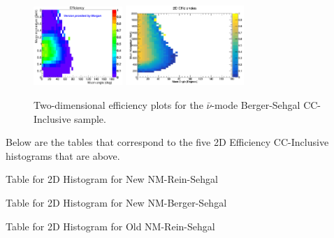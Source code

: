 \documentclass[11pt]{article}
\begin{document}
\begin{figure}[H]
\centering
\includegraphics[width=0.3\textwidth]{CCInclusivePlots/MorgansCCInclusiveSample.png}
\includegraphics[width=0.4\textwidth]{CCInclusivePlots/2DEffCompareANMBS.png}
\caption{Two-dimensional efficiency plots for the $\bar{\nu}$-mode Berger-Sehgal CC-Inclusive sample.}
\end{figure}\label{fig:TwoDEfficiencyBS}

Below are the tables that correspond to the five 2D Efficiency CC-Inclusive histograms that are above.

\newpage
\begin{landscape}
\begin{table}
\centering
\caption{Table for 2D Histogram for New NM-Rein-Sehgal}
\begin{adjustbox}{width=\paperwidth}
\end{adjustbox}
\end{table}
\end{landscape}

\newpage
\begin{landscape}
\begin{table}
\centering
\caption{Table for 2D Histogram for New NM-Berger-Sehgal}
\begin{adjustbox}{width=\paperwidth}
\end{adjustbox}
\end{table}
\end{landscape}

\newpage
\begin{landscape}
\begin{table}
\centering
\caption{Table for 2D Histogram for Old NM-Rein-Sehgal}
\begin{adjustbox}{width=\paperwidth}
\end{adjustbox}
\end{table}
\end{landscape}
\end{document}
